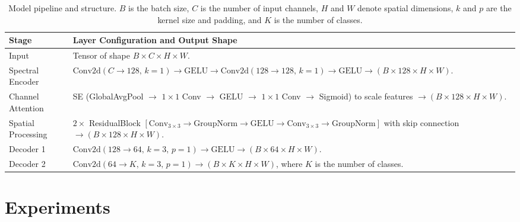 \documentclass[12pt]{elsarticle}
\begin{document}
\begin{table}[h]
\centering
\renewcommand{\arraystretch}{1.25}
\small
\begin{tabularx}{0.98\textwidth}{p{2.9cm} X}
\hline
\textbf{Stage} & \textbf{Layer Configuration and Output Shape} \\
\hline

Input &
Tensor of shape \( B \times C \times H \times W \). \\
\hline

Spectral Encoder &
\(\mathrm{Conv2d}(C \rightarrow 128,\, k=1) \rightarrow \mathrm{GELU} \rightarrow
  \mathrm{Conv2d}(128 \rightarrow 128,\, k=1) \rightarrow \mathrm{GELU}
  \rightarrow (B \times 128 \times H \times W)\). \\
\hline

Channel Attention &
SE (GlobalAvgPool \(\rightarrow\) \(1\times1\) Conv \(\rightarrow\) GELU 
\(\rightarrow\) \(1\times1\) Conv \(\rightarrow\) Sigmoid) to scale features 
\(\rightarrow (B \times 128 \times H \times W)\). \\
\hline

Spatial Processing &
\(2\times\) ResidualBlock 
\([\mathrm{Conv}_{3\times3} \rightarrow \mathrm{GroupNorm} \rightarrow \mathrm{GELU}
\rightarrow \mathrm{Conv}_{3\times3} \rightarrow \mathrm{GroupNorm}]\)
with skip connection
\(\rightarrow (B \times 128 \times H \times W)\). \\
\hline

Decoder 1 &
\(\mathrm{Conv2d}(128 \rightarrow 64,\, k=3,\, p=1) \rightarrow \mathrm{GELU}
\rightarrow (B \times 64 \times H \times W)\). \\
\hline

Decoder 2 &
\(\mathrm{Conv2d}(64 \rightarrow K,\, k=3,\, p=1)
\rightarrow (B \times K \times H \times W)\),  
where \(K\) is the number of classes. \\
\hline
\end{tabularx}

\caption{Model pipeline and structure. \(B\) is the batch size, \(C\) is the number of input channels,
\(H\) and \(W\) denote spatial dimensions, \(k\) and \(p\) are the kernel 
size and padding, and \(K\) is the number of classes.
}
\label{model_structure}
\end{table}


\section{Experiments}
\end{document}

